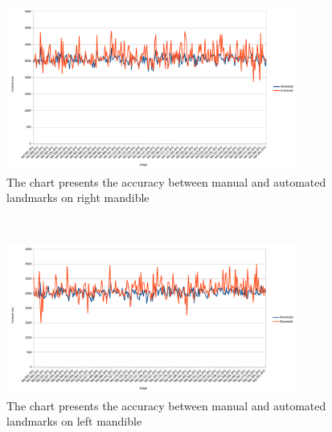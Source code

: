 \begin{figure}[h!]
\centering
\includegraphics[width=0.85\textwidth]{./images/MdChart}
\caption{The chart presents the accuracy between manual and automated landmarks on right mandible}
\label{figMdChart}
\end{figure}~\\
\begin{figure}[h!]
\centering
\includegraphics[width=0.85\textwidth]{./images/MgChart}
\caption{The chart presents the accuracy between manual and automated landmarks on left mandible}
\label{figMgChart}
\end{figure}~\\
